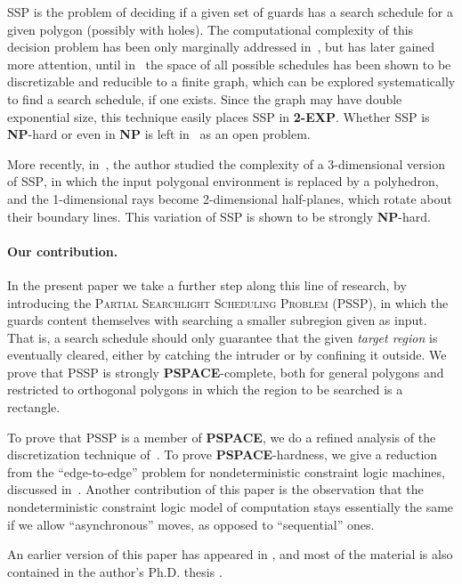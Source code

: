 \documentclass{style}
\newcommand{\complexityclass}[1]{\textbf{#1}}
\newcommand{\computproblem}[1]{\textsc{#1}}
\newcommand{\NP}{\complexityclass{NP}\xspace}
\newcommand{\TEXP}{\complexityclass{2-EXP}\xspace}
\newcommand{\PSPACE}{\complexityclass{PSPACE}\xspace}
\newcommand{\SSP}{\computproblem{SSP}\xspace}
\newcommand{\PSSP}{\computproblem{PSSP}\xspace}
\begin{document}
\SSP is the problem of deciding if a given set of guards has a search schedule for a given polygon (possibly with holes). The computational complexity of this decision problem has been only marginally addressed in~\cite{search}, but has later gained more attention, until in~\cite{bullo} the space of all possible schedules has been shown to be discretizable and reducible to a finite graph, which can be explored systematically to find a search schedule, if one exists. Since the graph may have double exponential size, this technique easily places \SSP in \TEXP. Whether \SSP is \NP-hard or even in \NP is left in~\cite{bullo} as an open problem.

More recently, in~\cite{viglietta2,viglietta}, the author studied the complexity of a 3-dimensional version of \SSP, in which  the input polygonal environment is replaced by a polyhedron, and the 1-dimensional rays become 2-dimensional half-planes, which rotate about their boundary lines. This variation of \SSP is shown to be strongly \NP-hard.

\paragraph{Our contribution.}

In the present paper we take a further step along this line of research, by introducing the \computproblem{Partial Searchlight Scheduling Problem} (\PSSP), in which the guards content themselves with searching a smaller subregion given as input. That is, a search schedule should only guarantee that the given \emph{target region} is eventually cleared, either by catching the intruder or by confining it outside. We prove that \PSSP is strongly \PSPACE-complete, both for general polygons and restricted to orthogonal polygons in which the region to be searched is a rectangle.

To prove that \PSSP is a member of \PSPACE, we do a refined analysis of the discretization technique of~\cite{bullo}. To prove \PSPACE-hardness, we give a reduction from the ``edge-to-edge'' problem for nondeterministic constraint logic machines, discussed in~\cite{ncl}. Another contribution of this paper is the observation that the nondeterministic constraint logic model of computation stays essentially the same if we allow ``asynchronous'' moves, as opposed to ``sequential'' ones.

An earlier version of this paper has appeared in \cite{eurocg}, and most of the material is also contained in the author's Ph.D. thesis \cite{thesis}.
\end{document}
